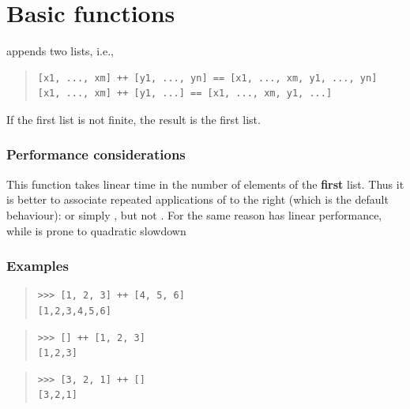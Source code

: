 \section{Basic functions}
\begin{haddockdesc}
\item[\begin{tabular}{@{}l}
(++) :: {\char 91}a{\char 93} -> {\char 91}a{\char 93} -> {\char 91}a{\char 93}
\end{tabular}]
{\haddockbegindoc
\haddockid{(++)} appends two lists, i.e.,\par
\begin{quote}
{\haddockverb\begin{verbatim}
[x1, ..., xm] ++ [y1, ..., yn] == [x1, ..., xm, y1, ..., yn]
[x1, ..., xm] ++ [y1, ...] == [x1, ..., xm, y1, ...]\end{verbatim}}
\end{quote}
If the first list is not finite, the result is the first list.\par
\subsubsection*{\textbf{Performance considerations}}
This function takes linear time in the number of elements of the
 \textbf{first} list. Thus it is better to associate repeated
 applications of \haddockid{(++)} to the right (which is the default behaviour):
  or simply , but not .
 For the same reason  \haddocktt{=}  \haddockid{(++)} 
 has linear performance, while  \haddockid{(++)}  is prone
 to quadratic slowdown\par
\subsubsection*{\textbf{Examples}}
\begin{quote}
{\haddockverb\begin{verbatim}
>>> [1, 2, 3] ++ [4, 5, 6]
[1,2,3,4,5,6]

\end{verbatim}}
\end{quote}
\begin{quote}
{\haddockverb\begin{verbatim}
>>> [] ++ [1, 2, 3]
[1,2,3]

\end{verbatim}}
\end{quote}
\begin{quote}
{\haddockverb\begin{verbatim}
>>> [3, 2, 1] ++ []
[3,2,1]

\end{verbatim}}
\end{quote}}
\end{haddockdesc}
